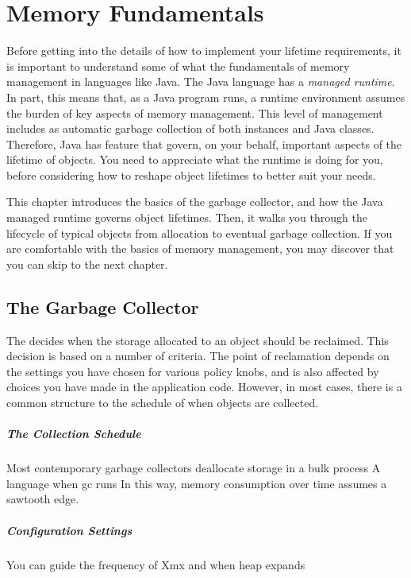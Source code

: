 
\chapter{Memory Fundamentals}

Before getting into the details of how to implement your lifetime requirements,
it is important to understand some of what the fundamentals of memory management
in languages like Java. The Java language has a \emph{managed runtime}. In part,
this means that, as a Java program runs, a runtime environment assumes the burden
of key aspects of memory management. This level of management includes as
automatic garbage collection of both instances and Java classes. Therefore, Java
has feature that govern, on your behalf, important aspects of the lifetime of
objects. You need to appreciate what the runtime is doing for you, before
considering how to reshape object lifetimes to better suit your needs.

This chapter introduces the basics of the garbage collector, and how the Java
managed runtime governs object lifetimes. Then, it walks you through the
lifecycle of typical objects from allocation to eventual garbage collection. If
you are comfortable with the basics of memory management, you may discover that
you can skip to the next chapter.

\section{The Garbage Collector}
The \jre decides when the storage allocated to an object should be reclaimed.
This decision is based on a number of criteria. The point of reclamation
depends on the settings you have chosen for various policy knobs, and is also
affected by choices you have made in the application code. However, in most
cases, there is a common structure to the schedule of when objects are
collected.

\paragraph{The Collection Schedule}
Most contemporary garbage collectors deallocate storage in a bulk process 
A language 
when gc runs
In this way, memory consumption over time assumes a sawtooth edge.

\paragraph{Configuration Settings}
You can guide the frequency of 
Xmx and when heap expands

